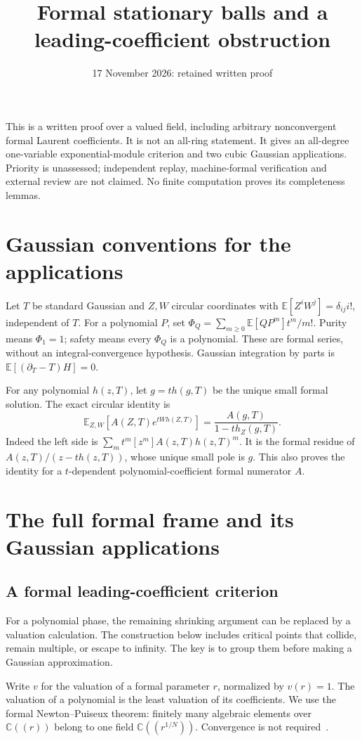 \documentclass[11pt]{article}
\title{Formal stationary balls and a leading-coefficient obstruction}
\author{}\date{17 November 2026: retained written proof}
\theoremstyle{definition}\newtheorem{definition}[theorem]{Definition}
\theoremstyle{remark}\newtheorem{remark}[theorem]{Remark}
\newcommand{\E}{\mathbb E}
\newcommand{\C}{\mathbb C}
\begin{document}
\maketitle
This is a written proof over a valued field, including arbitrary
nonconvergent formal Laurent coefficients. It is not an all-ring
statement. It gives an all-degree one-variable exponential-module
criterion and two cubic Gaussian applications. Priority is unassessed;
independent replay, machine-formal verification and external review
are not claimed. No finite computation proves its completeness lemmas.

\section{Gaussian conventions for the applications}
Let $T$ be standard Gaussian and $Z,W$ circular coordinates with
$\E[Z^iW^j]=\delta_{ij}i!$, independent of $T$. For a polynomial
$P$, set $\Phi_Q=\sum_{m\geq0}\E[QP^m]t^m/m!$. Purity means
$\Phi_1=1$; safety means every $\Phi_Q$ is a polynomial.
These are formal series, without an integral-convergence hypothesis.
Gaussian integration by parts is $\E[(\partial_T-T)H]=0$.

For any polynomial $h(z,T)$, let $g=th(g,T)$ be the unique small
formal solution. The exact circular identity is
\[
 \E_{Z,W}[A(Z,T)e^{tWh(Z,T)}]
       =\frac{A(g,T)}{1-th_Z(g,T)}.
\]
Indeed the left side is $\sum_m t^m[z^m]A(z,T)h(z,T)^m$.
It is the formal residue of $A(z,T)/(z-th(z,T))$, whose unique
small pole is $g$. This also proves the identity for a
$t$-dependent polynomial-coefficient formal numerator $A$.

\section{The full formal frame and its Gaussian applications}
\subsection{A formal leading-coefficient criterion}\label{sec:stationaryballs}

For a polynomial phase, the remaining shrinking argument can be
replaced by a valuation calculation. The construction below includes
critical points that collide, remain multiple, or escape to infinity.
The key is to group them before making a Gaussian approximation.

Write $v$ for the valuation of a formal parameter $r$, normalized by
$v(r)=1$. The valuation of a polynomial is the least valuation of its
coefficients. We use the formal Newton--Puiseux theorem: finitely many
algebraic elements over $\C((r))$ belong to one field
$\C((r^{1/N}))$. Convergence is not required~\cite[Chapter~2]{Wall}.
\end{document}
